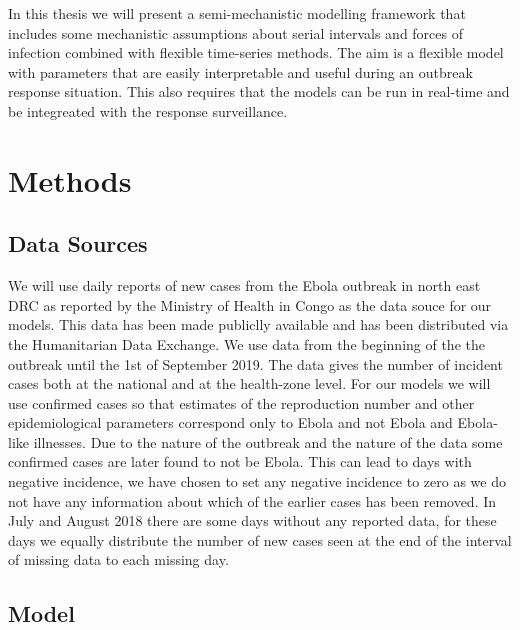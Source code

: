 \documentclass[12pt]{article}
\begin{document}
In this thesis we will present a semi-mechanistic modelling framework that includes some mechanistic assumptions about serial intervals and forces of infection combined with flexible time-series methods. The aim is a flexible model with parameters that are easily interpretable and useful during an outbreak response situation. This also requires that the models can be run in real-time and be integreated with the response surveillance. 

\section{Methods}

\subsection{Data Sources}

We will use daily reports of new cases from the Ebola outbreak in north east DRC as reported by the Ministry of Health in Congo as the data souce for our models. This data has been made publiclly available and has been distributed via the Humanitarian Data Exchange\cite{hummanitariandataexchangeEbolaCasesDeaths}. We use data from the beginning of the the outbreak until the 1st of September 2019. The data gives the number of incident cases both at the national and at the health-zone level. For our models we will use confirmed cases so that estimates of the reproduction number and other epidemiological parameters correspond only to Ebola and not Ebola and Ebola-like illnesses. Due to the nature of the outbreak and the nature of the data some confirmed cases are later found to not be Ebola. This can lead to days with negative incidence, we have chosen to set any negative incidence to zero as we do not have any information about which of the earlier cases has been removed. In July and August 2018 there are some days without any reported data, for these days we equally distribute the number of new cases seen at the end of the interval of missing data to each missing day. 

\subsection{Model}
\end{document}
